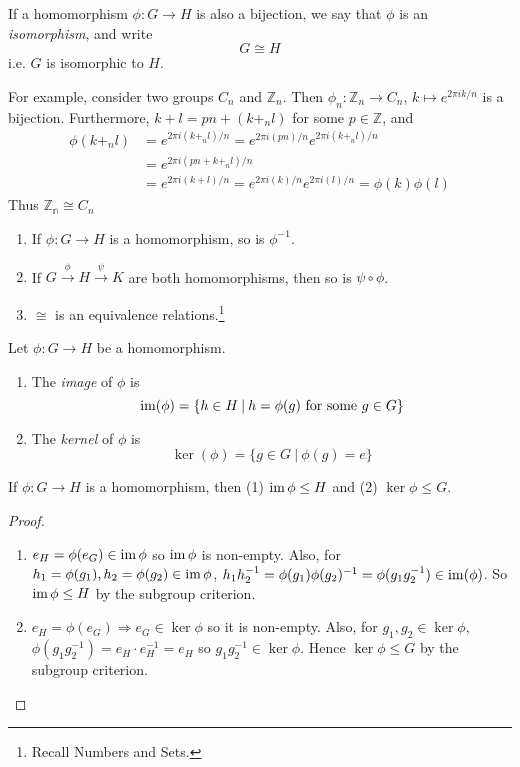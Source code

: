 \documentclass[10pt, a4paper, twoside]{report}
\begin{document}
\begin{definition}
    If a homomorphism \(\phi:G\to H\) is also a bijection, we say that \(\phi\) is an \emph{isomorphism}, and write 
    \[G\cong H\]
    i.e. \(G\) is isomorphic to \(H\).
\end{definition}
For example, consider two groups \(C_n\) and \(\mathbb{Z}_n\). Then \(\phi_n:\mathbb{Z}_n\to C_n\), \(k\mapsto e^{2\pi ik/n}\) is a bijection. Furthermore, \(k+l=pn+(k+_nl)\) for some \(p\in\mathbb{Z}\), and 
\begin{align*}
    \phi(k+_nl)&=e^{2\pi i(k+_nl)/n}=e^{2\pi i(pn)/n}e^{2\pi i(k+_nl)/n} \\
    &=e^{2\pi i(pn+k+_nl)/n} \\
    &=e^{2\pi i(k+l)/n}=e^{2\pi i(k)/n}e^{2\pi i(l)/n}=\phi(k)\phi(l)
\end{align*}
Thus \(\mathbb{Z_n}\cong{C_n}\)
\begin{lemma} \item[]
    \begin{enumerate}
        \item If \(\phi:G\to H\) is a homomorphism, so is \(\phi^{-1}\).
        \item If \(G\xrightarrow{\phi}H\xrightarrow{\psi}K\) are both homomorphisms, then so is \(\psi\circ\phi\).
        \item \(\cong\) is an equivalence relations.\footnote{Recall Numbers and Sets.}
    \end{enumerate}
\end{lemma}
\begin{definition}
    Let \(\phi:G\to H\) be a homomorphism. 
    \begin{enumerate}
        \item The \emph{image} of \(\phi\) is 
        \[\operatorname{im}(\phi)=\{h\in H\:|\:h=\phi(g)\text{  for some \(g\in G\)}\}\]
        \item The \emph{kernel} of \(\phi\) is 
        \[\ker(\phi)=\{g\in G\:|\:\phi(g)=e\}\]
    \end{enumerate}
\end{definition}
\begin{proposition}
    If \(\phi:G\to H\) is a homomorphism, then (1) \(\operatorname{im}\phi\leq H\) and (2) \(\ker\phi\leq G\).
\end{proposition}
\begin{proof} \item[] 
    \begin{enumerate}
        \item \(e_H=\phi(e_G)\in\operatorname{im}\phi\) so \(\operatorname{im}\phi\) is non-empty. Also, for \(h_1=\phi(g_1),h_2=\phi(g_2)\in\operatorname{im}\phi\), \(h_1h_2^{-1}=\phi(g_1)\phi(g_2)^{-1}=\phi(g_1g_2^{-1})\in\operatorname{im}(\phi)\). So \(\operatorname{im}\phi\leq H\) by the subgroup criterion.
        \item \(e_H=\phi(e_G)\Rightarrow e_G\in\ker\phi\) so it is non-empty. Also, for \(g_1,g_2\in\ker\phi\), \(\phi(g_1g_2^{-1})=e_H\cdot e_H^{-1}=e_H\) so \(g_1g_2^{-1}\in\ker\phi\). Hence \(\ker\phi\leq G\) by the subgroup criterion.
    \end{enumerate}
\end{proof}
\end{document}
